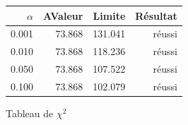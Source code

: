 \documentclass[10pt,a4paper]{article}
\begin{document}


\begin{figure}[h]
\centering
\begin{tabular}{|r|r|r|r|}
\hline
$\alpha$ & AValeur & Limite & Résultat\\
\hline
0.001 & 73.868 & 131.041 & réussi\\
0.010 & 73.868 & 118.236 & réussi\\
0.050 & 73.868 & 107.522 & réussi\\
0.100 & 73.868 & 102.079 & réussi\\
\hline
\end{tabular}
\caption{Tableau de $\chi^2$}
\end{figure}
\end{document}
